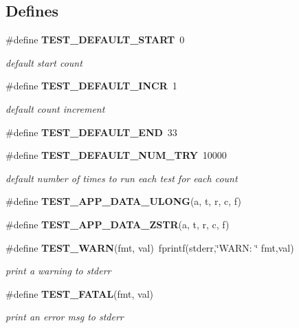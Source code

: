 \subsection*{Defines}
\begin{CompactItemize}
\item 
{}
\#define {\bf TEST\_\-DEFAULT\_\-START}\ 0\label{test__utils_8c_a7}

\begin{CompactList}\small\item\em default start count\item\end{CompactList}\item 
{}
\#define {\bf TEST\_\-DEFAULT\_\-INCR}\ 1\label{test__utils_8c_a8}

\begin{CompactList}\small\item\em default count increment\item\end{CompactList}\item 
\#define {\bf TEST\_\-DEFAULT\_\-END}\ 33
\item 
{}
\#define {\bf TEST\_\-DEFAULT\_\-NUM\_\-TRY}\ 10000\label{test__utils_8c_a10}

\begin{CompactList}\small\item\em default number of times to run each test for each count\item\end{CompactList}\item 
\#define {\bf TEST\_\-APP\_\-DATA\_\-ULONG}(a, t, r, c, f)
\item 
\#define {\bf TEST\_\-APP\_\-DATA\_\-ZSTR}(a, t, r, c, f)
\item 
{}
\#define {\bf TEST\_\-WARN}(fmt, val)\ fprintf(stderr,\char`\"{}WARN: \char`\"{} fmt,val)\label{test__utils_8c_a13}

\begin{CompactList}\small\item\em print a warning to stderr\item\end{CompactList}\item 
\#define {\bf TEST\_\-FATAL}(fmt, val)
\begin{CompactList}\small\item\em print an error msg to stderr\item\end{CompactList}\end{CompactItemize}
